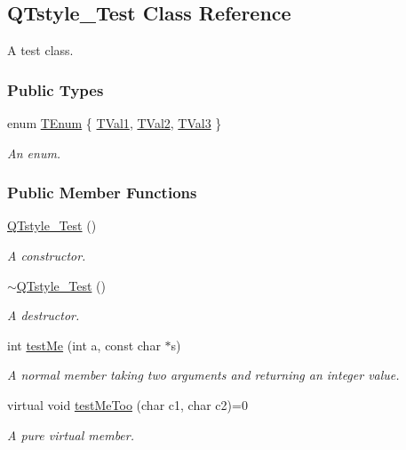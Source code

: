 \hypertarget{class_q_tstyle___test}{}\subsection{Q\+Tstyle\+\_\+\+Test Class Reference}
\label{class_q_tstyle___test}


A test class.  


\subsubsection*{Public Types}
\begin{DoxyCompactItemize}
\item 
enum \mbox{\hyperlink{class_q_tstyle___test_a0525f798cda415a94fedeceb806d2c49}{T\+Enum}} \{ \mbox{\hyperlink{class_q_tstyle___test_a0525f798cda415a94fedeceb806d2c49a7929af91f99c319ffe2e49c9632bc3fa}{T\+Val1}}, 
\mbox{\hyperlink{class_q_tstyle___test_a0525f798cda415a94fedeceb806d2c49afff89db6859123549579806212d9fd80}{T\+Val2}}, 
\mbox{\hyperlink{class_q_tstyle___test_a0525f798cda415a94fedeceb806d2c49a8227cd0f0c1285d59ff14376fcd00f85}{T\+Val3}}
 \}
\begin{DoxyCompactList}\small\item\em An enum. \end{DoxyCompactList}\end{DoxyCompactItemize}
\subsubsection*{Public Member Functions}
\begin{DoxyCompactItemize}
\item 
\mbox{\hyperlink{class_q_tstyle___test_a14a296ea4e2ad446712f2310bec60766}{Q\+Tstyle\+\_\+\+Test}} ()
\begin{DoxyCompactList}\small\item\em A constructor. \end{DoxyCompactList}\item 
\mbox{\hyperlink{class_q_tstyle___test_a7e82397d534d9a867f0857da01a46e9e}{$\sim$\+Q\+Tstyle\+\_\+\+Test}} ()
\begin{DoxyCompactList}\small\item\em A destructor. \end{DoxyCompactList}\item 
int \mbox{\hyperlink{class_q_tstyle___test_a8840748753118dd468e8368a28e49c62}{test\+Me}} (int a, const char $\ast$s)
\begin{DoxyCompactList}\small\item\em A normal member taking two arguments and returning an integer value. \end{DoxyCompactList}\item 
virtual void \mbox{\hyperlink{class_q_tstyle___test_ad5b201f097a720d44bf976c2f27efbda}{test\+Me\+Too}} (char c1, char c2)=0
\begin{DoxyCompactList}\small\item\em A pure virtual member. \end{DoxyCompactList}\end{DoxyCompactItemize}
